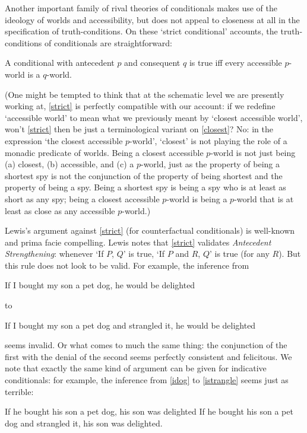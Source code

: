 \documentclass[If.tex]{subfiles}
\begin{document}
Another important family of rival theories of conditionals makes use of the ideology of worlds and accessibility, but does not appeal to closeness at all in the specification of truth-conditions. On these ‘strict conditional’ accounts, the truth-conditions of conditionals are straightforward:
\begin{prop}
\litem[STRICT] \label{strict}
	A conditional with antecedent $p$ and consequent $q$ is true iff every accessible $p$-world is a $q$-world.
\end{prop}
(One might be tempted to think that at the schematic level we are
presently working at, \ref{strict} is perfectly compatible with our account:
if we redefine ‘accessible world’ to mean what we previously meant by
‘closest accessible world’, won't \ref{strict} then be just a terminological
variant on \ref{closest}? No: in the expression ‘the closest accessible
$p$-world’, ‘closest’ is not playing the role of a monadic predicate of
worlds. Being a closest accessible $p$-world is not just being (a)
closest, (b) accessible, and (c) a $p$-world, just as the property of
being a shortest spy is not the conjunction of the property of being
shortest and the property of being a spy. Being a shortest spy is being
a spy who is at least as short as any spy; being a closest accessible
$p$-world is being a $p$-world that is at least as close as any accessible
$p$-world.)

Lewis's argument against \ref{strict} (for counterfactual conditionals) is
well-known and prima facie compelling. Lewis notes that \ref{strict} validates
\emph{Antecedent Strengthening}: whenever ‘If $P$, $Q$’ is true, ‘If $P$
and $R$, $Q$’ is true (for any $R$). But this rule does not look to be valid. For example, the inference
from
\begin{prop}
	\nitem \label{dog}
	If I bought my son a pet dog, he would be delighted
\end{prop}
to
\begin{prop}
	\nitem \label{strangle}
	If I bought my son a pet dog and strangled it, he would be delighted
\end{prop}
seems invalid. Or what comes to much the same thing: the conjunction of the first with the denial of the second seems perfectly consistent and felicitous. We note that exactly the same kind of argument can be given for indicative conditionals: for example, the inference from \ref{idog} to \ref{istrangle} seems just as terrible:
\begin{prop}
	\nitem \label{idog}
	If he bought his son a pet dog, his son was delighted
	\nitem \label{istrangle}
	If he bought his son a pet dog and strangled it, his son was delighted.
\end{prop}
\end{document}
